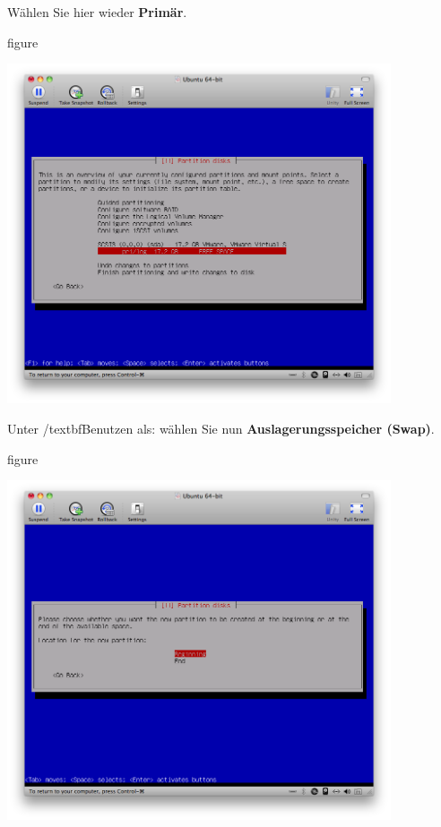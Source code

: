 Wählen Sie hier wieder \textbf{Primär}.

\begin{nofloat}{figure}
\begin{center}
\includegraphics[width=0.85\textwidth]{screenshots/13_ubuntu_install.png}
\end{center}
\end{nofloat}

\pagebreak
Unter /textbf{Benutzen als:} wählen Sie nun \textbf{Auslagerungsspeicher (Swap)}.

\begin{nofloat}{figure}
\begin{center}
\includegraphics[width=0.85\textwidth]{screenshots/17_ubuntu_install.png}
\end{center}
\end{nofloat}

